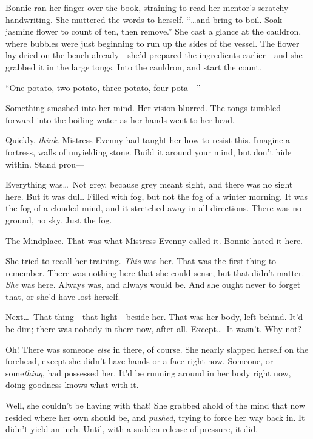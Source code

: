 
Bonnie ran her finger over the book, straining to read her mentor's scratchy handwriting.
She muttered the words to herself.
``{\dots}and bring to boil. Soak jasmine flower to count of ten, then remove.''
She cast a glance at the cauldron, where bubbles were just beginning to run up the sides of the vessel.
The flower lay dried on the bench already---she'd prepared the ingredients earlier---and she grabbed it in the large tongs.
Into the cauldron, and start the count.

``One potato, two potato, three potato, four pota---''


Something smashed into her mind.
Her vision blurred.
The tongs tumbled forward into the boiling water as her hands went to her head.

Quickly, \emph{think}.
Mistress Evenny had taught her how to resist this.
Imagine a fortress, walls of unyielding stone.
Build it around your mind, but don't hide within.
Stand prou---


Everything was{\dots}\ Not grey, because grey meant sight, and there was no sight here.
But it was dull.
Filled with fog, but not the fog of a winter morning.
It was the fog of a clouded mind, and it stretched away in all directions.
There was no ground, no sky.
Just the fog.

The Mindplace.
That was what Mistress Evenny called it.
Bonnie hated it here.

She tried to recall her training.
\emph{This} was her.
That was the first thing to remember.
There was nothing here that she could sense, but that didn't matter.
\emph{She} was here.
Always was, and always would be.
And she ought never to forget that, or she'd have lost herself.

Next{\dots}\ That thing---that light---beside her.
That was her body, left behind.
It'd be dim; there was nobody in there now, after all.
Except{\dots}\ It wasn't.
Why not?

Oh!
There was someone \emph{else} in there, of course.
She nearly slapped herself on the forehead, except she didn't have hands or a face right now.
Someone, or some\emph{thing}, had possessed her.
It'd be running around in her body right now, doing goodness knows what with it.

Well, she couldn't be having with that!
She grabbed ahold of the mind that now resided where her own should be, and \emph{pushed}, trying to force her way back in.
It didn't yield an inch.
Until, with a sudden release of pressure, it did.

